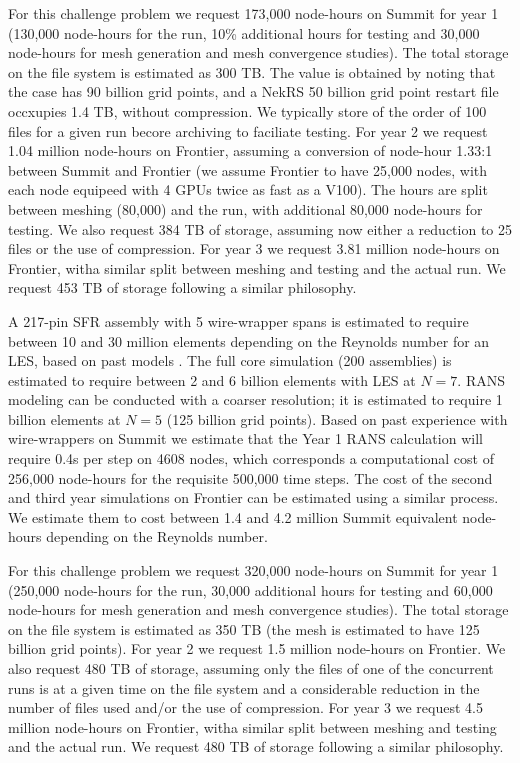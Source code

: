 For this challenge problem we request  173,000 node-hours on Summit for year 1 (130,000 node-hours for the run, 10\% additional hours for testing and 30,000 node-hours for mesh generation and mesh convergence studies). The total storage on the file system is estimated as 300 TB. The value is obtained by noting that the case has 90 billion grid points, and a NekRS 50 billion grid point restart file occxupies 1.4 TB, without compression. We typically store of the order of 100 files for a given run becore archiving to faciliate testing. For year 2 we request 1.04 million node-hours on Frontier, assuming a conversion of node-hour 1.33:1 between Summit and Frontier (we assume Frontier to have 25,000 nodes, with each node equipeed with 4 GPUs twice as fast as a V100). The hours are split between meshing (80,000) and the run, with additional 80,000 node-hours for testing. We also request 384 TB of storage, assuming now either a reduction to 25 files or the use of compression.  For year 3 we request 3.81 million node-hours on Frontier, witha  similar split between meshing and testing and the actual run. We request 453 TB of storage following a similar philosophy.

A 217-pin SFR assembly with 5 wire-wrapper spans is estimated to require
between 10 and 30 million elements depending on the Reynolds number for an LES,
based on past models \cite{merzari2020toward}. The full core simulation (200
assemblies) is estimated to require between 2 and 6 billion elements with
LES at $N=7$.  RANS modeling can be conducted with a coarser resolution;
it is estimated to require 1 billion elements at $N=5$ (125 billion grid
points).
%
Based on past experience with wire-wrappers on Summit we estimate that the Year
1 RANS calculation will require 0.4s per step on 4608 nodes, which corresponds
a computational cost of 256,000 node-hours for the requisite 500,000 time steps.
%
The cost of the second and third year simulations on Frontier can be estimated
using a similar process. We estimate them to cost between 1.4 and 4.2 million
Summit equivalent node-hours depending on the Reynolds number.

For this challenge problem we request  320,000 node-hours on Summit for year 1 (250,000 node-hours for the run, 30,000 additional hours for testing and 60,000 node-hours for mesh generation and mesh convergence studies). The total storage on the file system is estimated as 350 TB (the mesh is estimated to have 125 billion grid points).  For year 2 we request 1.5 million node-hours on Frontier. We also request 480 TB of storage, assuming only the files of one of the concurrent runs is at a given time on the file system and a considerable reduction in the number of files used and/or the use of compression.  For year 3 we request 4.5 million node-hours on Frontier, witha  similar split between meshing and testing and the actual run. We request 480 TB of storage following a similar philosophy. 


